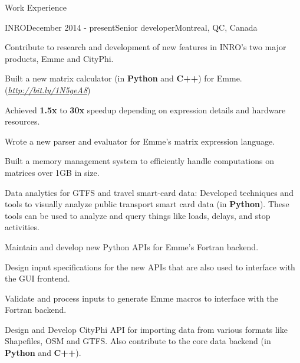 \documentclass{resume} %
\begin{document}
\begin{rSection}{Work Experience}

\begin{rSubsection}{INRO}{December 2014 - present}{Senior developer}{Montreal,
  QC, Canada}
\item Contribute to research and development of new features in INRO's two
  major products, Emme and CityPhi.
\item Built a new matrix calculator (in \textbf{Python} and \textbf{C++}) for 
  Emme.(\href{http://bit.ly/1N5geA8}{\em{http://bit.ly/1N5geA8}})
\begin{lsubSubsection} 
\item Achieved \textbf{1.5x} to \textbf{30x} speedup depending on expression details and hardware
  resources.
\item Wrote a new parser and evaluator for Emme's matrix expression language.
\item Built a memory management system to efficiently handle computations on
  matrices over 1GB in size.
\end{lsubSubsection}
\item Data analytics for GTFS and travel smart-card data: Developed techniques and tools
  to visually analyze public transport smart card data (in \textbf{Python}).
  These tools can be used to analyze and query things like loads, delays, and stop activities.
\item Maintain and develop new Python APIs for Emme's Fortran backend.  
\begin{lsubSubsection}
\item Design input specifications for the new APIs that are also used to
	interface with the GUI frontend.
\item Validate and process inputs to generate Emme macros to interface with the
	Fortran backend.
\end{lsubSubsection}
\item Design and Develop CityPhi API for importing data from various formats
	like Shapefiles, OSM and GTFS. Also contribute to the core data
	backend (in \textbf{Python} and \textbf{C++}).
\end{rSubsection}


\end{rSection}
\end{document}
